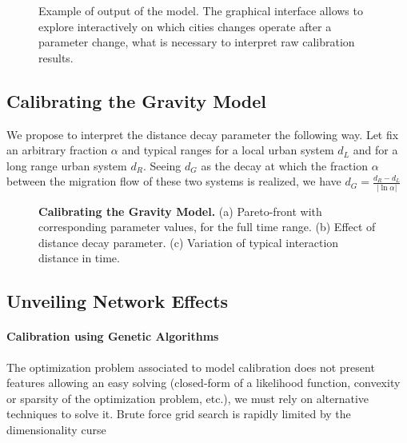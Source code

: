 \documentclass[Royal,sageh,times]{sagej}
\begin{document}
\begin{figure}
\centering
\caption{Example of output of the model. The graphical interface allows to explore interactively on which cities changes operate after a parameter change, what is necessary to interpret raw calibration results.}
\end{figure}




\subsection*{Calibrating the Gravity Model}




We propose to interpret the distance decay parameter the following way. Let fix an arbitrary fraction $\alpha$ and typical ranges for a local urban system $d_L$ and for a long range urban system $d_R$. Seeing $d_G$ as the decay at which the fraction $\alpha$ between the migration flow of these two systems is realized, we have $d_G = \frac{d_R - d_L}{\left| \ln{\alpha} \right|}$


\begin{figure}
\centering


\caption{\textbf{Calibrating the Gravity Model.} (a) Pareto-front with corresponding parameter values, for the full time range. (b) Effect of distance decay parameter. (c) Variation of typical interaction distance in time.}
\label{fig:calib-gravity}
\end{figure}


\subsection*{Unveiling Network Effects}



\paragraph{Calibration using Genetic Algorithms}


The optimization problem associated to model calibration does not present features allowing an easy solving (closed-form of a likelihood function, convexity or sparsity of the optimization problem, etc.), we must rely on alternative techniques to solve it. Brute force grid search is rapidly limited by the dimensionality curse
\end{document}
